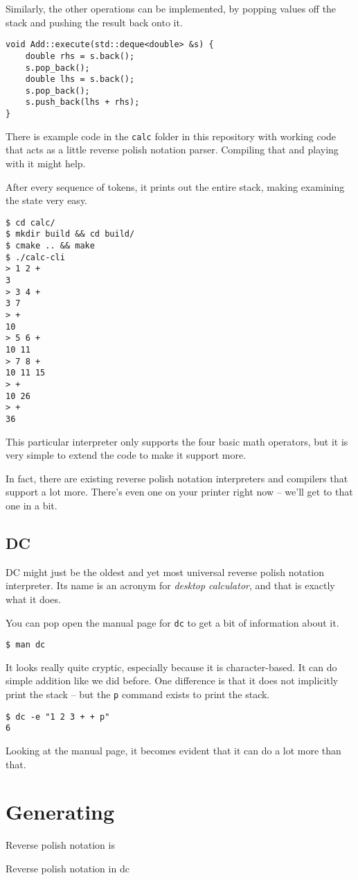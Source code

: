 \documentclass[a4paper,twocolumn]{article}
\begin{document}
Similarly, the other operations can be implemented, by popping values off the stack and pushing the result back onto it.

\begin{verbatim}
void Add::execute(std::deque<double> &s) {
    double rhs = s.back();
    s.pop_back();
    double lhs = s.back();
    s.pop_back();
    s.push_back(lhs + rhs);
}  
\end{verbatim}

There is example code in the \verb|calc| folder in this repository with working code that acts as a little reverse polish notation parser. Compiling that and playing with it might help.

After every sequence of tokens, it prints out the entire stack, making examining the state very easy.

\begin{verbatim}
$ cd calc/
$ mkdir build && cd build/
$ cmake .. && make
$ ./calc-cli
> 1 2 +
3
> 3 4 +
3 7
> +
10
> 5 6 +
10 11
> 7 8 +
10 11 15
> +
10 26
> +
36
\end{verbatim}

This particular interpreter only supports the four basic math operators, but it is very simple to extend the code to make it support more.

In fact, there are existing reverse polish notation interpreters and compilers that support a lot more. There's even one on your printer right now -- we'll get to that one in a bit.

\subsection{DC}

DC might just be the oldest and yet most universal reverse polish notation interpreter. Its name is an acronym for \emph{desktop calculator}, and that is exactly what it does.

You can pop open the manual page for \verb|dc| to get a bit of information about it.

\begin{verbatim}
$ man dc
\end{verbatim}

It looks really quite cryptic, especially because it is character-based. It can do simple addition like we did before. One difference is that it does not implicitly print the stack -- but the \verb|p| command exists to print the stack.

\begin{verbatim}
$ dc -e "1 2 3 + + p"
6
\end{verbatim}

Looking at the manual page, it becomes evident that it can do a lot more than that. 


\section{Generating}

Reverse polish notation is


Reverse polish notation in dc
\end{document}
